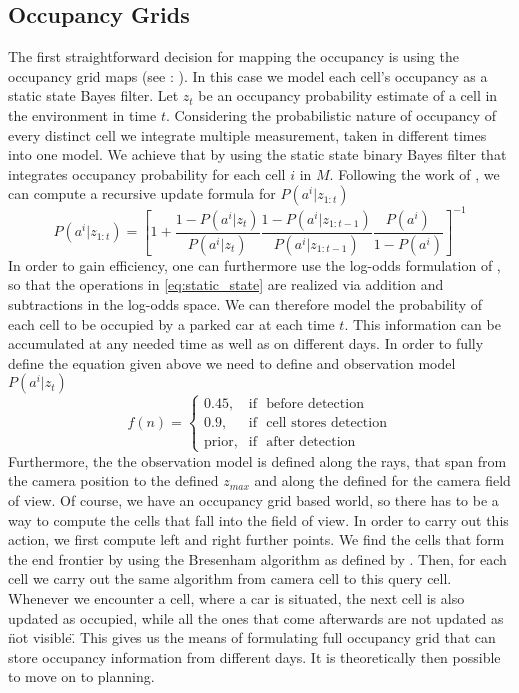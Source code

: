     \subsection{Occupancy Grids} %
    \label{sub:occupancy_grids}
        The first straightforward decision for mapping the occupancy is using the occupancy grid maps (see : ). In this case we model each cell's occupancy as a static state Bayes filter.
        Let $z_t$ be an occupancy probability estimate of a cell in the environment in time $t$. Considering the probabilistic nature of occupancy of every distinct cell we integrate multiple measurement, taken in different times into one model. We achieve that by using the static state binary Bayes filter that integrates occupancy probability for each cell $i$ in $M$. Following the work of \cite{moravec1988}, we can compute a recursive update formula for $P(a^i | z_{1:t})$
        \begin{equation}
        \label{eq:static_state}
            P(a^i | z_{1:t}) = \left[1 + \frac{1 - P(a^i | z_{t})}{P(a^i | z_{t})} \frac{1 - P(a^i | z_{1:t-1})}{P(a^i | z_{1:t-1})} \frac{P(a^i)}{1 - P(a^i)} \right]^{-1}
        \end{equation}
        In order to gain efficiency, one can furthermore use the log-odds formulation of \cite{moravec1988}, so that the operations in \eqref{eq:static_state} are realized via addition and subtractions in the log-odds space.
        We can therefore model the probability of each cell to be occupied by a parked car at each time $t$.
        This information can be accumulated at any needed time as well as on different days.
        In order to fully define the equation given above we need to define and observation model $P(a^i | z_t)$
        $$ f(n) = \begin{cases} 0.45, & \mbox{if } \mbox{ before detection} \\ 0.9, & \mbox{if } \mbox{ cell stores detection} \\ \mbox{prior}, & \mbox{if } \mbox{ after detection} \end{cases} $$
        Furthermore, the the observation model is defined along the rays, that span from the camera position to the defined $z_{max}$ and along the defined for the camera field of view. Of course, we have an occupancy grid based world, so there has to be a way to compute the cells that fall into the field of view. In order to carry out this action, we first compute left and right further points. We find the cells that form the end frontier by using the Bresenham algorithm as defined by \cite{bresenham1965}. Then, for each cell we carry out the same algorithm from camera cell to this query cell. Whenever we encounter a cell, where a car is situated, the next cell is also updated as occupied, while all the ones that come afterwards are not updated as \"not visible\".
        This gives us the means of formulating full occupancy grid that can store occupancy information from different days. It is theoretically then possible to move on to planning.
